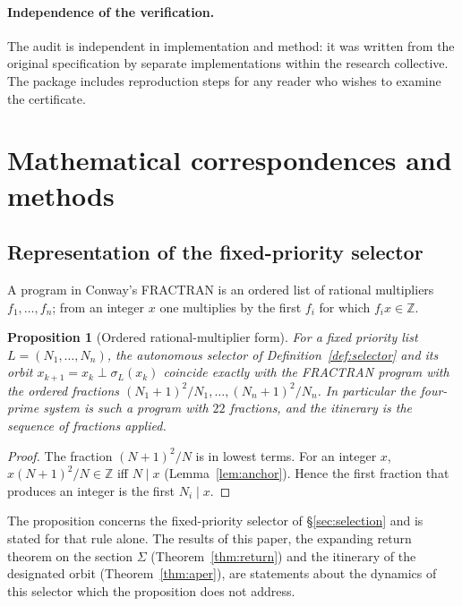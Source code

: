 \documentclass[11pt,a4paper]{article}
\newtheorem{proposition}[theorem]{Proposition}
\theoremstyle{definition}
\newcommand{\Z}{\mathbb{Z}}
\newcommand{\nest}{\mathbin{\perp}}
\newcommand{\Sig}{\Sigma}
\begin{document}
\paragraph{Independence of the verification.} The audit is independent in implementation and method: it was written from the original specification by separate implementations within the research collective. The package includes reproduction steps for any reader who wishes to examine the certificate.

\section{Mathematical correspondences and methods}\label{sec:relation}

\subsection{Representation of the fixed-priority selector}\label{subsec:fractran}
A program in Conway's FRACTRAN \cite{conway87,conway72} is an ordered list of rational multipliers $f_1,\dots,f_n$; from an integer $x$ one multiplies by the first $f_i$ for which $f_ix\in\Z$.

\begin{proposition}[Ordered rational-multiplier form]\label{prop:fractran}
For a fixed priority list $L=(N_1,\dots,N_n)$, the autonomous selector of Definition~\ref{def:selector} and its orbit $x_{k+1}=x_k\nest\sigma_L(x_k)$ coincide exactly with the FRACTRAN program with the ordered fractions $(N_1+1)^2/N_1,\dots,(N_n+1)^2/N_n$. In particular the four-prime system is such a program with $22$ fractions, and the itinerary is the sequence of fractions applied.
\end{proposition}
\begin{proof}
The fraction $(N+1)^2/N$ is in lowest terms. For an integer $x$, $x(N+1)^2/N\in\Z$ iff $N\mid x$ (Lemma~\ref{lem:anchor}). Hence the first fraction that produces an integer is the first $N_i\mid x$.
\end{proof}
The proposition concerns the fixed-priority selector of \S\ref{sec:selection} and is stated for that rule alone. The results of this paper, the expanding return theorem on the section $\Sig$ (Theorem~\ref{thm:return}) and the itinerary of the designated orbit (Theorem~\ref{thm:aper}), are statements about the dynamics of this selector which the proposition does not address.
\end{document}
